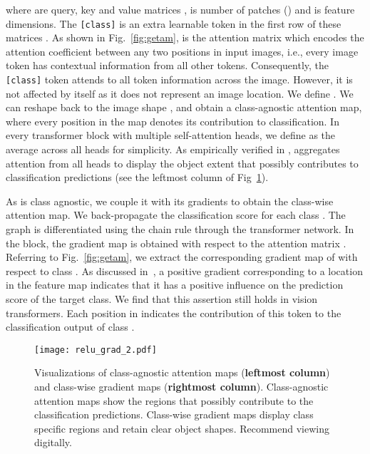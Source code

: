 \documentclass[10pt,twocolumn,letterpaper]{article}
\begin{document}
\noindent
where  are query, key and value matrices ,  is number of patches () and  is feature dimensions.
The \texttt{[class]} is an extra learnable token in the first row of these matrices \cite{dosovitskiy2020image}.
As shown in Fig.~\ref{fig:getam},  is the attention matrix which encodes the attention coefficient between any two positions in input images, i.e., every image token has contextual information from all other tokens.
Consequently, 
the \texttt{[class]} token attends to all token information across the image. However, it is not affected by itself as it does not represent an image location.
We define .
We can reshape  back to the image shape , and obtain a class-agnostic attention map, where every position in the map denotes its contribution to classification.
In every transformer block with multiple self-attention heads, we define  as the average across all heads for simplicity. 
As empirically verified in \cite{gao2021tscam}, 
aggregates attention from all heads to display the object extent that possibly contributes to classification predictions (see the leftmost column
of Fig~\ref{fig:relu grad}). 


As  is class agnostic, we couple it with its gradients
 to obtain the class-wise attention map.
We back-propagate the classification
score  for each class .
The graph is differentiated using the chain rule through the transformer network.
In the  block, 
the gradient map  is obtained with respect to the attention matrix .
Referring to Fig.~\ref{fig:getam}, we extract the corresponding gradient map
 of  with respect to class .
As discussed in~\cite{selvaraju2017grad,chattopadhay2018grad,jiang2021layercam}, a positive gradient corresponding
to a location in the feature map indicates that it has a positive influence on
the prediction score of the target class.
We find that this assertion still holds in vision transformers.
Each position in  indicates the contribution of this token to the classification output of class .
\begin{figure}[!t]
\begin{center}
  {\texttt{[image: relu\_grad\_2.pdf]}}
  \end{center}
\caption{Visualizations of class-agnostic attention maps (\textbf{leftmost column}) and class-wise gradient maps (\textbf{rightmost column}). Class-agnostic attention maps show the regions that possibly contribute to the classification predictions. Class-wise gradient maps display class specific regions and retain clear object shapes. Recommend viewing digitally. 
}
\label{fig:relu grad}
\end{figure}
\end{document}
